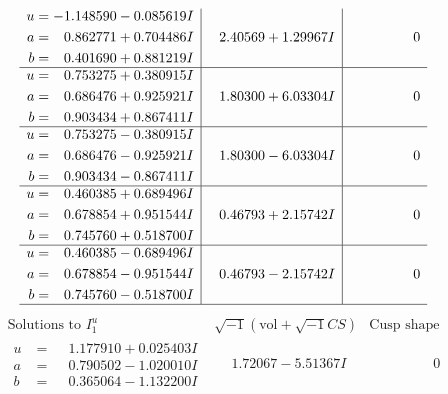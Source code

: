 \documentclass[1p]{elsarticle_modified}
\theoremstyle{definition}
\newcommand{\I}{\sqrt{-1}}
\begin{document}
$$\begin{array}{c|c|c}
\begin{aligned}
u &= -1.148590 - 0.085619 I \\
a &= \phantom{-}0.862771 + 0.704486 I \\
b &= \phantom{-}0.401690 + 0.881219 I\end{aligned}
 & \phantom{-}2.40569 + 1.29967 I & \phantom{-0.000000 } 0 \\ \hline\begin{aligned}
u &= \phantom{-}0.753275 + 0.380915 I \\
a &= \phantom{-}0.686476 + 0.925921 I \\
b &= \phantom{-}0.903434 + 0.867411 I\end{aligned}
 & \phantom{-}1.80300 + 6.03304 I & \phantom{-0.000000 } 0 \\ \hline\begin{aligned}
u &= \phantom{-}0.753275 - 0.380915 I \\
a &= \phantom{-}0.686476 - 0.925921 I \\
b &= \phantom{-}0.903434 - 0.867411 I\end{aligned}
 & \phantom{-}1.80300 - 6.03304 I & \phantom{-0.000000 } 0 \\ \hline\begin{aligned}
u &= \phantom{-}0.460385 + 0.689496 I \\
a &= \phantom{-}0.678854 + 0.951544 I \\
b &= \phantom{-}0.745760 + 0.518700 I\end{aligned}
 & \phantom{-}0.46793 + 2.15742 I & \phantom{-0.000000 } 0 \\ \hline\begin{aligned}
u &= \phantom{-}0.460385 - 0.689496 I \\
a &= \phantom{-}0.678854 - 0.951544 I \\
b &= \phantom{-}0.745760 - 0.518700 I\end{aligned}
 & \phantom{-}0.46793 - 2.15742 I & \phantom{-0.000000 } 0\\
 \hline 
 \end{array}$$\newpage$$\begin{array}{c|c|c}  
\text{Solutions to }I^u_{1}& \I (\text{vol} + \sqrt{-1}CS) & \text{Cusp shape}\\
 \hline 
\begin{aligned}
u &= \phantom{-}1.177910 + 0.025403 I \\
a &= \phantom{-}0.790502 - 1.020010 I \\
b &= \phantom{-}0.365064 - 1.132200 I\end{aligned}
 & \phantom{-}1.72067 - 5.51367 I & \phantom{-0.000000 } 0 \\ \hline\begin{aligned}

\end{aligned}
\end{array}$$
\end{document}
